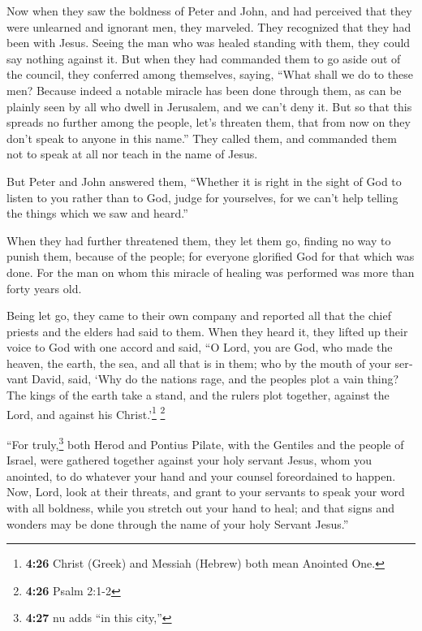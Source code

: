 \begin{paracol}{2}
\begin{otherlanguage}{english}
 Now when they saw the boldness of Peter and John, and
had perceived that they were unlearned and ignorant men, they marveled.
They recognized that they had been with Jesus.  Seeing
the man who was healed standing with them, they could say nothing
against it.  But when they had commanded them to go aside
out of the council, they conferred among themselves, 
saying, ``What shall we do to these men? Because indeed a notable
miracle has been done through them, as can be plainly seen by all who
dwell in Jerusalem, and we can't deny it.  But so that
this spreads no further among the people, let's threaten them, that from
now on they don't speak to anyone in this name.''  They
called them, and commanded them not to speak at all nor teach in the
name of Jesus.

 But Peter and John answered them, ``Whether it is right
in the sight of God to listen to you rather than to God, judge for
yourselves,  for we can't help telling the things which
we saw and heard.''

 When they had further threatened them, they let them go,
finding no way to punish them, because of the people; for everyone
glorified God for that which was done.  For the man on
whom this miracle of healing was performed was more than forty years
old.

 Being let go, they came to their own company and
reported all that the chief priests and the elders had said to them.
 When they heard it, they lifted up their voice to God
with one accord and said, ``O Lord, you are God, who made the heaven,
the earth, the sea, and all that is in them;  who by the
mouth of your servant David, said, `Why do the nations rage, and the
peoples plot a vain thing?  The kings of the earth take a
stand, and the rulers plot together, against the Lord, and against his
Christ.'\footnote{\textbf{4:26} Christ (Greek) and Messiah (Hebrew) both
  mean Anointed One.} \footnote{\textbf{4:26} Psalm 2:1-2}

 ``For truly,\footnote{\textbf{4:27} nu adds ``in this
  city,''} both Herod and Pontius Pilate, with the Gentiles and the
people of Israel, were gathered together against your holy servant
Jesus, whom you anointed,  to do whatever your hand and
your counsel foreordained to happen.  Now, Lord, look at
their threats, and grant to your servants to speak your word with all
boldness,  while you stretch out your hand to heal; and
that signs and wonders may be done through the name of your holy Servant
Jesus.''


\end{otherlanguage}
\end{paracol}
